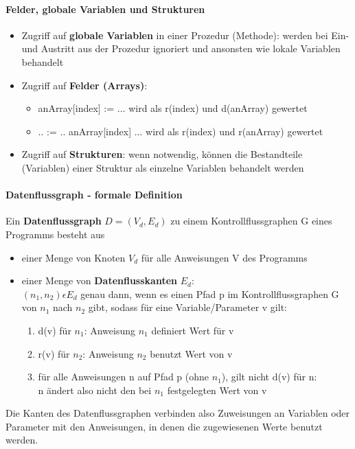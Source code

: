 \paragraph{Felder, globale Variablen und Strukturen}
\begin{itemize}
	\item Zugriff auf \textbf{globale Variablen} in einer Prozedur (Methode): werden bei Ein- und Austritt aus der Prozedur ignoriert und ansonsten wie lokale Variablen behandelt
	\item Zugriff auf \textbf{Felder (Arrays)}:
	\begin{itemize}
		\item anArray[index] := ... wird als r(index) und d(anArray) gewertet
		\item .. := .. anArray[index] ... wird als r(index) und r(anArray) gewertet
	\end{itemize}
	\item Zugriff auf \textbf{Strukturen}: wenn notwendig, können die Bestandteile (Variablen) einer Struktur als einzelne Variablen behandelt werden
\end{itemize}

\paragraph{Datenflussgraph - formale Definition}
Ein \textbf{Datenflussgraph} $D = (V_{d}, E_{d})$ zu einem Kontrollflussgraphen G eines Programms besteht aus
\begin{itemize}
	\item einer Menge von Knoten $V_{d}$ für alle Anweisungen V des Programms
	\item einer Menge von \textbf{Datenflusskanten} $E_{d}$: \\
	$ (n_{1}, n_{2}) \epsilon E_{d} $ genau dann, wenn es einen Pfad p im Kontrollflussgraphen G von $n_{1}$ nach $n_{2}$ gibt, sodass für eine Variable/Parameter v gilt:
	\begin{enumerate}
		\item d(v) für $n_{1}$: Anweisung $n_{1}$ definiert Wert für v
		\item r(v) für $n_{2}$: Anweisung $n_{2}$ benutzt Wert von v
		\item für alle Anweisungen n auf Pfad p (ohne $n_{1}$), gilt nicht d(v) für n: \\
		n ändert also nicht den bei $n_{1}$ festgelegten Wert von v
	\end{enumerate}
\end{itemize}
Die Kanten des Datenflussgraphen verbinden also Zuweisungen an Variablen oder Parameter mit den Anweisungen, in denen die zugewiesenen Werte benutzt werden.

